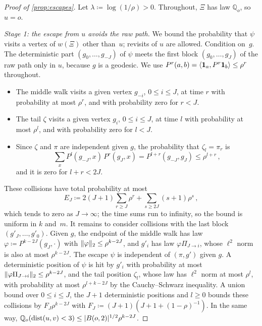 \begin{proof}[Proof of \cref{prop:escapes}]
Let $\lambda\coloneqq\log(1/\rho)>0$. Throughout, $\Xi$ has law $\mathbb Q_o$, so $u=o$.

\emph{Stage 1: the escape from $u$ avoids the raw path.} We bound the probability that $\psi$ visits a
vertex of $w(\Xi)$ other than~$u$; revisits of $u$ are allowed. Condition on~$g$. The deterministic part
$(g_0,\dots,g_{-J})$ of $\psi$ meets the first block $(g_0,\dots,g_J)$ of the raw path only in $u$,
because $g$ is a geodesic. We use $P^r(a,b)=\langle\mathbf{1}_a,P^r\mathbf{1}_b\rangle\le\rho^r$ throughout.
\begin{itemize}
  \item The middle walk visits a given vertex $g_{-i}$, $0\le i\le J$, at time $r$ with probability at
  most $\rho^r$, and with probability zero for $r<J$.
  \item The tail $\zeta$ visits a given vertex $g_i$, $0\le i\le J$, at time $l$ with probability at most
  $\rho^l$, and with probability zero for $l<J$.
  \item Since $\zeta$ and $\pi$ are independent given $g$, the probability that $\zeta_l=\pi_r$ is
  \begin{equation*}
    \sum_xP^l(g_{-J},x)\,P^r(g_J,x)=P^{l+r}(g_{-J},g_J)\le\rho^{l+r}\,,
  \end{equation*}
  and it is zero for $l+r<2J$.
\end{itemize}
These collisions have total probability at most
\begin{equation*}
  E_J\coloneqq2(J+1)\sum_{r\ge J}\rho^r+\sum_{s\ge2J}(s+1)\rho^s\,,
\end{equation*}
which tends to zero as $J\to\infty$; the time sums run to infinity, so the bound is uniform in $k$
and~$m$. It remains to consider collisions with the last block $(g'_J,\dots,g'_0)$. Given $g$, the
endpoint of the middle walk has law $\varphi\coloneqq P^{k-2J}(g_J,\cdot)$ with
$\lVert\varphi\rVert_2\le\rho^{k-2J}$, and $g'_i$ has law $\varphi\Pi_{J\to i}$, whose $\ell^2$ norm is also at
most $\rho^{k-2J}$. The escape $\psi$ is independent of $(\pi,g')$ given $g$. A deterministic position
of $\psi$ is hit by $g'_i$ with probability at most $\lVert\varphi\Pi_{J\to i}\rVert_2\le\rho^{k-2J}$, and the
tail position $\zeta_l$, whose law has $\ell^2$ norm at most $\rho^l$, with probability at most
$\rho^{l+k-2J}$ by the Cauchy--Schwarz inequality. A union bound over $0\le i\le J$, the $J+1$
deterministic positions and $l\ge0$ bounds these collisions by $F_J\rho^{k-2J}$ with
$F_J\coloneqq(J+1)(J+1+(1-\rho)^{-1})$. In the same way,
$\mathbb Q_o(\operatorname{dist}(u,v)<3)\le\lvert B(o,2)\rvert^{1/2}\rho^{k-2J}$.


\end{proof}

